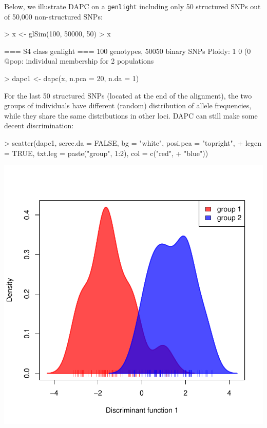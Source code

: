 \documentclass{article}
\begin{document}
Below, we illustrate DAPC on a \texttt{genlight} including only 50 structured SNPs out of 50,000
non-structured SNPs:
\begin{Schunk}
\begin{Sinput}
> x <- glSim(100, 50000, 50)
> x
\end{Sinput}
\begin{Soutput}
 === S4 class genlight ===
 100 genotypes,  50050 binary SNPs
 Ploidy: 1
 0 (0 %
 @pop: individual membership for 2 populations
\end{Soutput}
\begin{Sinput}
> dapc1 <- dapc(x, n.pca = 20, n.da = 1)
\end{Sinput}
\end{Schunk}

For the last 50 structured SNPs (located at the end of the alignment), the two groups of individuals have different (random) distribution of
allele frequencies, while they share the same distributions in other loci.
DAPC can still make some decent discrimination:
\begin{Schunk}
\begin{Sinput}
> scatter(dapc1, scree.da = FALSE, bg = "white", posi.pca = "topright", 
+     legen = TRUE, txt.leg = paste("group", 1:2), col = c("red", 
+         "blue"))
\end{Sinput}
\end{Schunk}
\includegraphics{figs/genomics-058}
\end{document}
